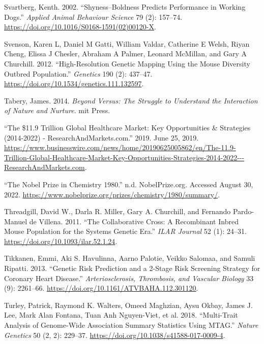 \documentclass[
]{book}
\newlength{\cslhangindent}
\newlength{\cslentryspacingunit} %
\newenvironment{CSLReferences}[2] %
 {%
  \setlength{\parindent}{0pt}
  \ifodd #1
  \let\oldpar\par
  \def\par{\hangindent=\cslhangindent\oldpar}
  \fi
  \setlength{\parskip}{#2\cslentryspacingunit}
 }%
 {}
\begin{document}
\begin{CSLReferences}{1}{0}
\leavevmode{}%
Svartberg, Kenth. 2002. {``Shyness--Boldness Predicts Performance in Working Dogs.''} \emph{Applied Animal Behaviour Science} 79 (2): 157--74. \url{https://doi.org/10.1016/S0168-1591(02)00120-X}.

\leavevmode{}%
Svenson, Karen L, Daniel M Gatti, William Valdar, Catherine E Welsh, Riyan Cheng, Elissa J Chesler, Abraham A Palmer, Leonard McMillan, and Gary A Churchill. 2012. {``High-{Resolution Genetic Mapping Using} the {Mouse Diversity Outbred Population}.''} \emph{Genetics} 190 (2): 437--47. \url{https://doi.org/10.1534/genetics.111.132597}.

\leavevmode{}%
Tabery, James. 2014. \emph{Beyond Versus: {The} Struggle to Understand the Interaction of Nature and Nurture}. {mit Press}.

\leavevmode{}%
{``The \$11.9 {Trillion Global Healthcare Market}: {Key Opportunities} \& {Strategies} (2014-2022) - {ResearchAndMarkets}.com.''} 2019. June 25, 2019. \url{https://www.businesswire.com/news/home/20190625005862/en/The-11.9-Trillion-Global-Healthcare-Market-Key-Opportunities-Strategies-2014-2022---ResearchAndMarkets.com}.

\leavevmode{}%
{``The {Nobel Prize} in {Chemistry} 1980.''} n.d. {NobelPrize.org}. Accessed August 30, 2022. \url{https://www.nobelprize.org/prizes/chemistry/1980/summary/}.

\leavevmode{}%
Threadgill, David W., Darla R. Miller, Gary A. Churchill, and Fernando Pardo-Manuel de Villena. 2011. {``The {Collaborative Cross}: {A Recombinant Inbred Mouse Population} for the {Systems Genetic Era}.''} \emph{ILAR Journal} 52 (1): 24--31. \url{https://doi.org/10.1093/ilar.52.1.24}.

\leavevmode{}%
Tikkanen, Emmi, Aki S. Havulinna, Aarno Palotie, Veikko Salomaa, and Samuli Ripatti. 2013. {``Genetic {Risk Prediction} and a 2-{Stage Risk Screening Strategy} for {Coronary Heart Disease}.''} \emph{Arteriosclerosis, Thrombosis, and Vascular Biology} 33 (9): 2261--66. \url{https://doi.org/10.1161/ATVBAHA.112.301120}.

\leavevmode{}%
Turley, Patrick, Raymond K. Walters, Omeed Maghzian, Aysu Okbay, James J. Lee, Mark Alan Fontana, Tuan Anh Nguyen-Viet, et al. 2018. {``Multi-Trait Analysis of Genome-Wide Association Summary Statistics Using {MTAG}.''} \emph{Nature Genetics} 50 (2, 2): 229--37. \url{https://doi.org/10.1038/s41588-017-0009-4}.


\end{CSLReferences}
\end{document}
